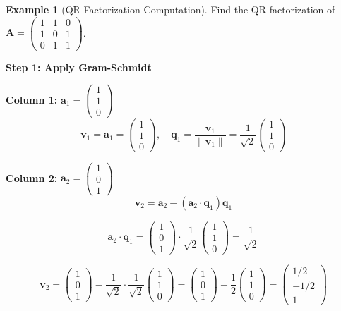 \documentclass[12pt]{article}
\numberwithin{equation}{section}
\newcommand{\vect}[1]{\boldsymbol{#1}}   %
\newcommand{\mat}[1]{\mathbf{#1}}        %
\theoremstyle{plain}
\theoremstyle{definition}
\newtheorem{example}[theorem]{Example}
\theoremstyle{remark}
\begin{document}
\begin{example}[QR Factorization Computation]
Find the QR factorization of $\mat{A} = \begin{pmatrix} 1 & 1 & 0 \\ 1 & 0 & 1 \\ 0 & 1 & 1 \end{pmatrix}$.

\textbf{Step 1: Apply Gram-Schmidt}

\textbf{Column 1:} $\vect{a}_1 = \begin{pmatrix} 1 \\ 1 \\ 0 \end{pmatrix}$
$$\vect{v}_1 = \vect{a}_1 = \begin{pmatrix} 1 \\ 1 \\ 0 \end{pmatrix}, \quad \vect{q}_1 = \frac{\vect{v}_1}{\|\vect{v}_1\|} = \frac{1}{\sqrt{2}}\begin{pmatrix} 1 \\ 1 \\ 0 \end{pmatrix}$$

\textbf{Column 2:} $\vect{a}_2 = \begin{pmatrix} 1 \\ 0 \\ 1 \end{pmatrix}$
$$\vect{v}_2 = \vect{a}_2 - (\vect{a}_2 \cdot \vect{q}_1)\vect{q}_1$$

$$\vect{a}_2 \cdot \vect{q}_1 = \begin{pmatrix} 1 \\ 0 \\ 1 \end{pmatrix} \cdot \frac{1}{\sqrt{2}}\begin{pmatrix} 1 \\ 1 \\ 0 \end{pmatrix} = \frac{1}{\sqrt{2}}$$

$$\vect{v}_2 = \begin{pmatrix} 1 \\ 0 \\ 1 \end{pmatrix} - \frac{1}{\sqrt{2}} \cdot \frac{1}{\sqrt{2}}\begin{pmatrix} 1 \\ 1 \\ 0 \end{pmatrix} = \begin{pmatrix} 1 \\ 0 \\ 1 \end{pmatrix} - \frac{1}{2}\begin{pmatrix} 1 \\ 1 \\ 0 \end{pmatrix} = \begin{pmatrix} 1/2 \\ -1/2 \\ 1 \end{pmatrix}$$


\end{example}
\end{document}
